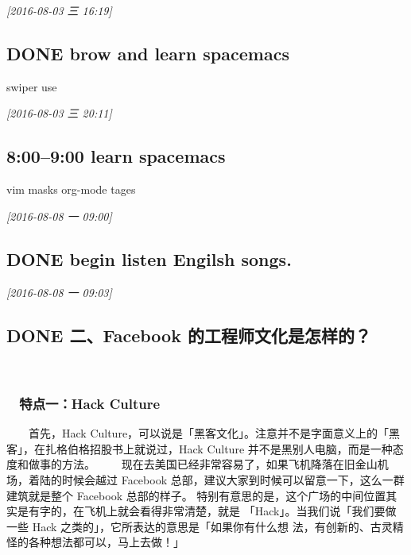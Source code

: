\documentclass[11pt]{ctexart}
\begin{document}
\textit{[2016-08-03 三 16:19]}

\subsection{{\bfseries\sffamily DONE} brow and learn spacemacs}
\label{sec:orgheadline7}
swiper use

\textit{[2016-08-03 三 20:11]}

\subsection{8:00--9:00 learn spacemacs}
\label{sec:orgheadline8}
vim masks
org-mode tages


\textit{[2016-08-08 一 09:00]}

\subsection{{\bfseries\sffamily DONE} begin listen Engilsh songs.}
\label{sec:orgheadline9}
\textit{[2016-08-08 一 09:03]}

\subsection{{\bfseries\sffamily DONE} 二、Facebook 的工程师文化是怎样的？}
\label{sec:orgheadline32}
　

\subsubsection{　特点一：Hack Culture}
\label{sec:orgheadline12}
　　首先，Hack Culture，可以说是「黑客文化」。注意并不是字面意义上的「黑客」，在扎格伯格招股书上就说过，Hack Culture 并不是黑别人电脑，而是一种态度和做事的方法。
　　现在去美国已经非常容易了，如果飞机降落在旧金山机场，着陆的时候会越过 Facebook 总部，建议大家到时候可以留意一下，这么一群建筑就是整个 Facebook 总部的样子。
特别有意思的是，这个广场的中间位置其实是有字的，在飞机上就会看得非常清楚，就是
「Hack」。当我们说「我们要做一些 Hack 之类的」，它所表达的意思是「如果你有什么想
法，有创新的、古灵精怪的各种想法都可以，马上去做！」
\end{document}
